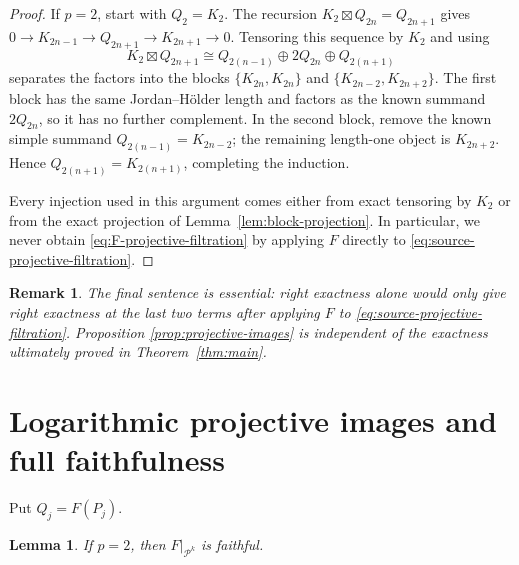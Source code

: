 \documentclass[12pt,leqno]{amsart}
\numberwithin{equation}{section}
\newtheorem{lem}[thm]{Lemma}
\newtheorem{rmk}[thm]{Remark}
\newcommand{\boxt}{\boxtimes}
\begin{document}
\begin{proof}
If $p=2$, start with $Q_2=K_2$.  The recursion
$K_2\boxt Q_{2n}=Q_{2n+1}$ gives
$0\to K_{2n-1}\to Q_{2n+1}\to K_{2n+1}\to0$.  Tensoring this sequence by
$K_2$ and using
\[
 K_2\boxt Q_{2n+1}
 \cong Q_{2(n-1)}\oplus2Q_{2n}\oplus Q_{2(n+1)}
\]
separates the factors into the blocks
$\{K_{2n},K_{2n}\}$ and $\{K_{2n-2},K_{2n+2}\}$.  The first block has the
same Jordan--H\"older length and factors as the known summand $2Q_{2n}$,
so it has no further complement.  In the second block, remove the known
simple summand $Q_{2(n-1)}=K_{2n-2}$; the remaining length-one object is
$K_{2n+2}$.  Hence $Q_{2(n+1)}=K_{2(n+1)}$, completing the induction.

Every injection used in this argument comes either from exact tensoring by
$K_2$ or from the exact projection of Lemma~\ref{lem:block-projection}.  In particular, we
never obtain \eqref{eq:F-projective-filtration} by applying $F$ directly to
\eqref{eq:source-projective-filtration}.
\end{proof}

\begin{rmk}\label{rmk:no-left-exactness}
The final sentence is essential: right exactness alone would only give
right exactness at the last two terms after applying $F$ to
\eqref{eq:source-projective-filtration}.  Proposition
\ref{prop:projective-images} is independent of the exactness ultimately
proved in Theorem~\ref{thm:main}.
\end{rmk}

\section{Logarithmic projective images and full faithfulness}\label{sec:fullness}

Put $Q_j=F(P_j)$.

\begin{lem}\label{lem:p-two-faithful}
If $p=2$, then $F|_{\mathcal P^k}$ is faithful.
\end{lem}
\end{document}
